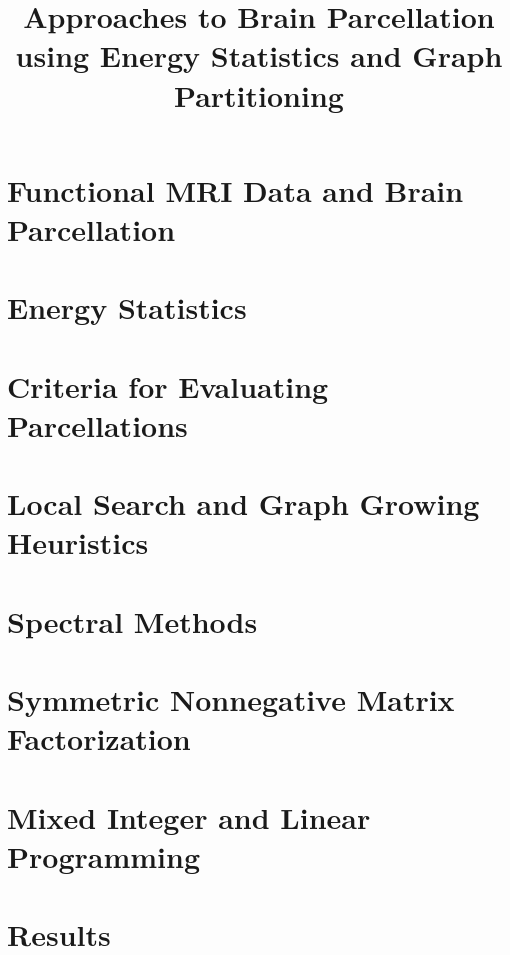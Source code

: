 \documentclass[12pt,lot,lof]{report}
\title{Approaches to Brain Parcellation using Energy Statistics and Graph Partitioning}
\begin{document}
\chapter{Functional MRI Data and Brain Parcellation}
%

\chapter{Energy Statistics}


\chapter{Criteria for Evaluating Parcellations}


\chapter{Local Search and Graph Growing Heuristics}


\chapter{Spectral Methods}


\chapter{Symmetric Nonnegative Matrix Factorization}


\chapter{Mixed Integer and Linear Programming}


\chapter{Results}




\end{document}
